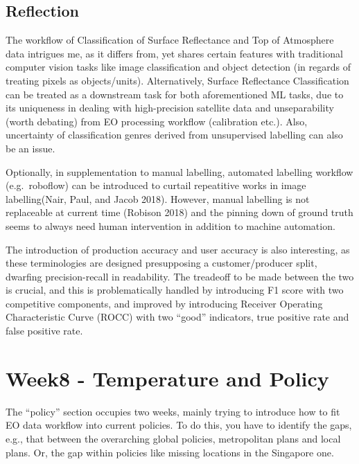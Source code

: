 \documentclass[
  letterpaper,
  DIV=11,
  numbers=noendperiod]{scrreprt}
\begin{document}
\hypertarget{reflection-5}{%
\section{Reflection}\label{reflection-5}}

The workflow of Classification of Surface Reflectance and Top of
Atmosphere data intrigues me, as it differs from, yet shares certain
features with traditional computer vision tasks like image
classification and object detection (in regards of treating pixels as
objects/units). Alternatively, Surface Reflectance Classification can be
treated as a downstream task for both aforementioned ML tasks, due to
its uniqueness in dealing with high-precision satellite data and
unseparability (worth debating) from EO processing workflow (calibration
etc.). Also, uncertainty of classification genres derived from
unsupervised labelling can also be an issue.

Optionally, in supplementation to manual labelling, automated labelling
workflow (e.g.~roboflow) can be introduced to curtail repeatitive works
in image labelling(Nair, Paul, and Jacob 2018). However, manual
labelling is not replaceable at current time (Robison 2018) and the
pinning down of ground truth seems to always need human intervention in
addition to machine automation.

The introduction of production accuracy and user accuracy is also
interesting, as these terminologies are designed presupposing a
customer/producer split, dwarfing precision-recall in readability. The
treadeoff to be made between the two is crucial, and this is
problematically handled by introducing F1 score with two competitive
components, and improved by introducing Receiver Operating
Characteristic Curve (ROCC) with two ``good'' indicators, true positive
rate and false positive rate.


\hypertarget{week8---temperature-and-policy}{%
\chapter{Week8 - Temperature and
Policy}\label{week8---temperature-and-policy}}

The ``policy'' section occupies two weeks, mainly trying to introduce
how to fit EO data workflow into current policies. To do this, you have
to identify the gaps, e.g., that between the overarching global
policies, metropolitan plans and local plans. Or, the gap within
policies like missing locations in the Singapore one.
\end{document}
